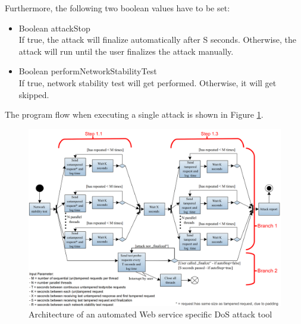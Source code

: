 \newpage
Furthermore, the following two boolean values have to be set: 
\begin{itemize}
  \item Boolean attackStop\\If true, the attack will finalize automatically after S seconds. Otherwise, the attack will run until the user finalizes the attack manually. 
  \item Boolean performNetworkStabilityTest\\If true, network stability test will get performed. Otherwise, it will get skipped.
\end{itemize}

The program flow when executing a single attack is shown in Figure \ref{fig:architectureDosAttackTool}.
\begin{landscape}
  \begin{figure}[!ht]
	  \centering
	  \vspace{20pt}
	  \includegraphics[width=23cm]{img/architecture.png}
	  \caption{Architecture of an automated Web service specific DoS attack tool}
	  \label{fig:architectureDosAttackTool}
  \end{figure}
\end{landscape}

